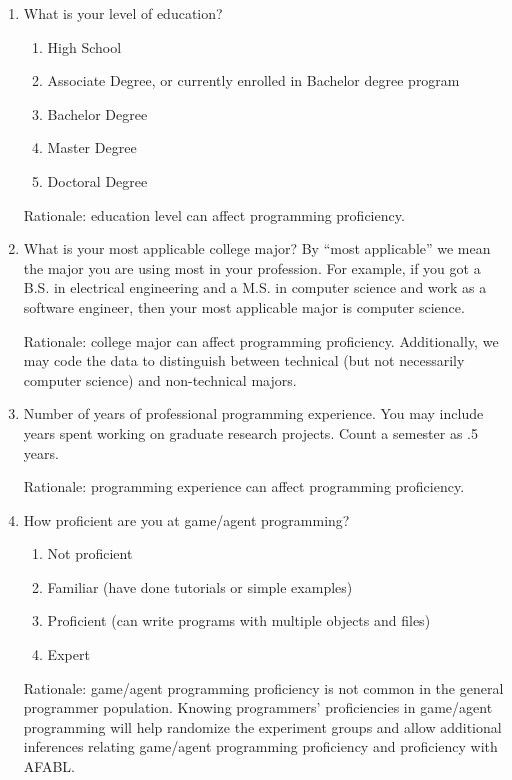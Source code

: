 \begin{enumerate}

\item What is your level of education?

\begin{enumerate}
\item High School
\item Associate Degree, or currently enrolled in Bachelor degree program
\item Bachelor Degree
\item Master Degree
\item Doctoral Degree
\end{enumerate}

Rationale: education level can affect programming proficiency.

\item What is your most applicable college major? By “most applicable” we mean the major you are using most in your profession. For example, if you got a B.S. in electrical engineering and a M.S. in computer science and work as a software engineer, then your most applicable major is computer science.

Rationale: college major can affect programming proficiency.  Additionally, we may code the data to distinguish between technical (but not necessarily computer science) and non-technical majors.

\item Number of years of professional programming experience. You may include years spent working on graduate research projects. Count a semester as .5 years.

Rationale: programming experience can affect programming proficiency.

\item How proficient are you at game/agent programming?  
\begin{enumerate}
\item Not proficient
\item Familiar (have done tutorials or simple examples)
\item Proficient (can write programs with multiple objects and files)
\item Expert
\end{enumerate}

Rationale: game/agent programming proficiency is not common in the general programmer population.  Knowing programmers’ proficiencies in game/agent programming will help randomize the experiment groups and allow additional inferences relating game/agent programming proficiency and proficiency with AFABL.


\end{enumerate}
